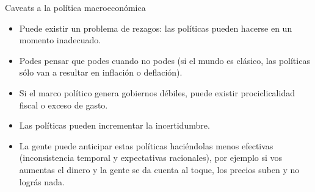 \documentclass{beamer}
\begin{document}
\begin{frame}{Caveats a la política macroeconómica}

    \begin{itemize}
    \item Puede existir un problema de rezagos: las políticas pueden hacerse en un momento inadecuado.
    \item Podes pensar que podes cuando no podes (si el mundo es clásico, las políticas sólo van a resultar en inflación o deflación).
    \item Si el marco político genera gobiernos débiles, puede existir prociclicalidad fiscal o exceso de gasto.
    \item Las políticas pueden incrementar la incertidumbre.
    \item La gente puede anticipar estas políticas haciéndolas menos efectivas (inconsistencia temporal y expectativas racionales), por ejemplo si vos aumentas el dinero y la gente se da cuenta al toque, los precios suben y no lográs nada.
    \end{itemize}

\end{frame}



\end{document}
